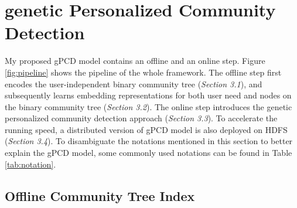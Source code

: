 \section{genetic Personalized Community Detection}

%
My proposed gPCD model contains an offline and an online step. Figure \ref{fig:pipeline} shows the pipeline of the whole framework. The offline step first encodes the user-independent binary community tree (\textit{Section 3.1}), and subsequently learns embedding representations for both user need and nodes on the binary community tree (\textit{Section 3.2}). The online step introduces the genetic personalized community detection approach (\textit{Section 3.3}). To accelerate the running speed, a distributed version of gPCD model is also deployed on HDFS (\textit{Section 3.4}).  To disambiguate the notations mentioned in this section to better explain the gPCD model, some commonly used notations can be found in Table \ref{tab:notation}. 

\subsection{Offline Community Tree Index} 

